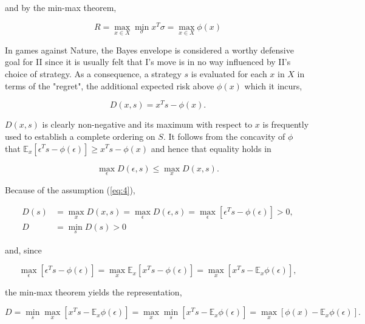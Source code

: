 \documentclass[11pt]{article}
\theoremstyle{boldStyle}
\begin{document}
and by the min-max theorem, 

\begin{equation} \label{eq:16}
    R = \max_{x \in X} \min_{\sigma} x^T \sigma = \max_{x \in X} \phi(x)
\end{equation}

\bigbreak

In games against Nature, the Bayes envelope is considered a worthy defensive goal for II since it is usually felt that I's 
move is in no way influenced by II's choice of strategy. As a consequence, a strategy \( s \) is evaluated for each 
\( x \) in \( X \) in terms of the "regret", the additional expected risk above \( \phi (x) \) which it incurs,

\begin{equation} \label{eq:17}
    D(x, s) = x^T s - \phi(x).
\end{equation}

\( D(x, s) \) is clearly non-negative and its maximum with respect to \( x \) is frequently used to establish a complete ordering on \( S \). 
It follows from the concavity of \( \phi \) that \( \mathbb{E}_x [\epsilon^T s - \phi(\epsilon)] \geq x^T s - \phi(x) \) and hence that equality holds in

\[
\max_{\epsilon} D(\epsilon, s) \leq \max_x D(x, s).
\]

Because of the assumption (\ref{eq:4}),

\begin{equation} \label{eq:18}
    \begin{aligned}
        D(s) &= \max_x D(x, s) = \max_{\epsilon} D(\epsilon, s) = \max_{\epsilon} [\epsilon^T s - \phi (\epsilon)] > 0, \\
        D &= \min_s D(s) > 0
    \end{aligned}
\end{equation}


and, since

\[
\max_{\epsilon} [\epsilon^T s - \phi (\epsilon)] = \max_x \mathbb{E}_x [x^T s - \phi(\epsilon)] = \max_x [x^T s - \mathbb{E}_x \phi (\epsilon)],
\]

the min-max theorem yields the representation,

\begin{purplebox}
    \begin{equation} \label{eq:19}
        D = \min_s \max_x [x^T s - \mathbb{E}_x \phi (\epsilon)] = \max_x \min_s [x^T s - \mathbb{E}_x \phi (\epsilon)] = \max_x [\phi (x) - \mathbb{E}_x \phi (\epsilon)].    
    \end{equation}
\end{purplebox}
\end{document}
